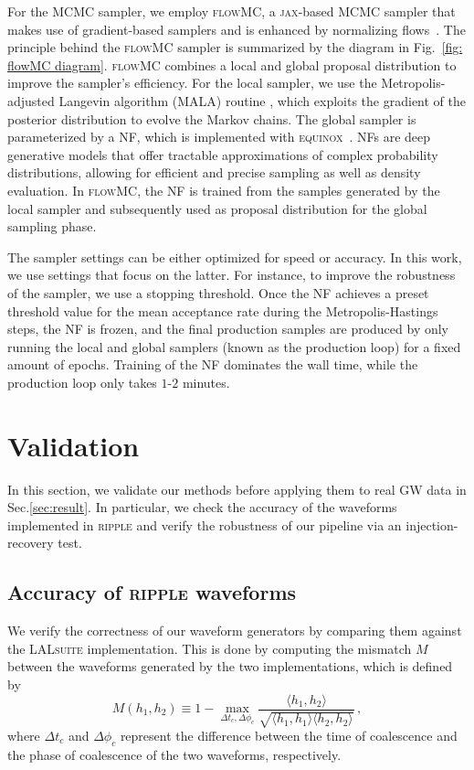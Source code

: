 \documentclass[prd,twocolumn,a4paper,floatfix,nofootinbib,preprintnumbers,superscriptaddress]{revtex4-1}
\begin{document}
For the \ac{MCMC} sampler, we employ \textsc{flowMC}, a \textsc{jax}-based \ac{MCMC} sampler that makes use of gradient-based samplers and is enhanced by normalizing flows~\cite{Wong:2022xvh, Gabrie:2021tlu}. The principle behind the \textsc{flowMC} sampler is summarized by the diagram in Fig.~\ref{fig: flowMC diagram}. \textsc{flowMC} combines a local and global proposal distribution to improve the sampler's efficiency. For the local sampler, we use the Metropolis-adjusted Langevin algorithm (MALA) routine \cite{grenander1994representations}, which exploits the gradient of the posterior distribution to evolve the Markov chains. The global sampler is parameterized by a \ac{NF}, which is implemented with \textsc{equinox}~\cite{kidger2021equinox}. \acp{NF} are deep generative models that offer tractable approximations of complex probability distributions, allowing for efficient and precise sampling as well as density evaluation. In \textsc{flowMC}, the \ac{NF} is trained from the samples generated by the local sampler and subsequently used as proposal distribution for the global sampling phase.

The sampler settings can be either optimized for speed or accuracy. In this work, we use settings that focus on the latter. For instance, to improve the robustness of the sampler, we use a stopping threshold. Once the \ac{NF} achieves a preset threshold value for the mean acceptance rate during the Metropolis-Hastings steps, the \ac{NF} is frozen, and the final production samples are produced by only running the local and global samplers (known as the production loop) for a fixed amount of epochs. Training of the \ac{NF} dominates the wall time, while the production loop only takes $1$-$2$ minutes. 

\section{Validation} \label{sec:validation}

In this section, we validate our methods before applying them to real \ac{GW} data in Sec.\ref{sec:result}. In particular, we check the accuracy of the waveforms implemented in \textsc{ripple} and verify the robustness of our pipeline via an injection-recovery test.

\subsection{Accuracy of {\normalfont \textsc{ripple}} waveforms}
We verify the correctness of our waveform generators by comparing them against the \textsc{LALsuite} \cite{lalsuite} implementation. This is done by computing the mismatch $M$ between the waveforms generated by the two implementations, which is defined by
\begin{equation}
    M(h_1, h_2) \equiv 1 - \max_{\Delta t_c, \Delta \phi_c} \frac{\langle h_1, h_2 \rangle}{\sqrt{\langle h_1, h_1 \rangle \langle h_2, h_2 \rangle}} \, ,
\end{equation}
where $\Delta t_c$ and $\Delta \phi_c$ represent the difference between the time of coalescence and the phase of coalescence of the two waveforms, respectively.
\end{document}
